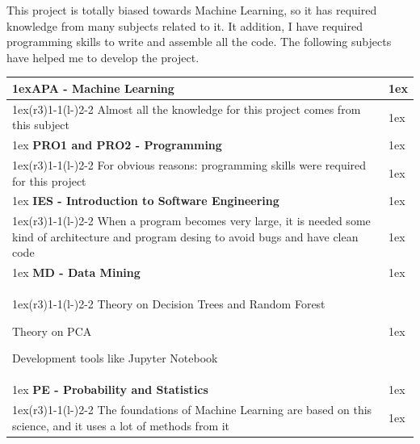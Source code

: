 \documentclass{article}
\begin{document}
This project is totally biased towards Machine Learning, so it has required
knowledge from many subjects related to it. It addition, I have required
programming skills to write and assemble all the code. The following subjects
have helped me to develop the project.
\begin{table}[H]
\begin{tabularx}{\linewidth}{>{\parskip1ex}X@{\kern4\tabcolsep}>{\parskip1ex}X}
\toprule
\hfil\bfseries APA - Machine Learning
\\\cmidrule(r{3\tabcolsep}){1-1}\cmidrule(l{-\tabcolsep}){2-2}
Almost all the knowledge for this project comes from this subject\par
\\\bottomrule
\hfil\bfseries PRO1 and PRO2 - Programming
\\\cmidrule(r{3\tabcolsep}){1-1}\cmidrule(l{-\tabcolsep}){2-2}
For obvious reasons: programming skills were required for this project\par
\\\bottomrule
\hfil\bfseries IES - Introduction to Software Engineering
\\\cmidrule(r{3\tabcolsep}){1-1}\cmidrule(l{-\tabcolsep}){2-2}
When a program becomes very large, it is needed some kind of architecture and
program desing to avoid bugs and have clean code\par
\\\bottomrule
\hfil\bfseries MD - Data Mining
\\\cmidrule(r{3\tabcolsep}){1-1}\cmidrule(l{-\tabcolsep}){2-2}
Theory on Decision Trees and Random Forest\par
Theory on PCA\par
Development tools like Jupyter Notebook\par
\\\bottomrule
\hfil\bfseries PE - Probability and Statistics
\\\cmidrule(r{3\tabcolsep}){1-1}\cmidrule(l{-\tabcolsep}){2-2}
The foundations of Machine Learning are based on this science, and it uses a lot
of methods from it\par
\\\bottomrule
\end{tabularx}
\end{table}
\end{document}
